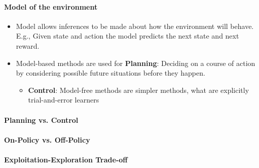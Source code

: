 \documentclass[a4paper, twoside, 12pt]{article}
\begin{document}
\paragraph{Model of the environment}
\label{sec:orge92d90a}
\begin{itemize}
\item Model allows inferences to be made about how the environment will behave.
E.g., Given state and action the model predicts the next state and next reward.
\item Model-based methods are used for \textbf{\textbf{Planning}}: Deciding on a course of action by
considering possible future situations before they happen.
\begin{itemize}
\item \textbf{\textbf{Control}}: Model-free methods are simpler methods, what are explicitly trial-and-error learners
\end{itemize}
\end{itemize}

\paragraph{Planning vs. Control}
\label{sec:org0153e00}
\paragraph{On-Policy vs. Off-Policy}
\label{sec:org233d941}
\paragraph{Exploitation-Exploration Trade-off}
\label{sec:orgb113a54}
\end{document}
